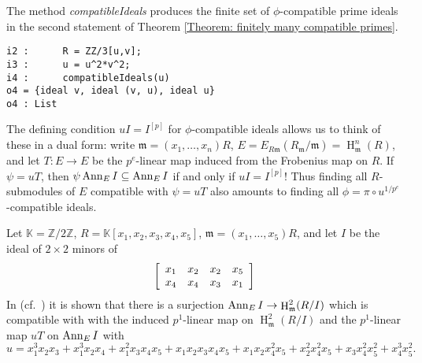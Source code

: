 \documentclass[11pt]{amsart}
\DeclareMathOperator{\HH}{H}
\begin{document}
The method \emph{compatibleIdeals} produces the finite set of $\phi$-compatible prime ideals in the second statement of Theorem \ref{Theorem: finitely many compatible primes}.

\begin{verbatim}
i2 :      R = ZZ/3[u,v];
i3 :      u = u^2*v^2;
i4 :      compatibleIdeals(u)
o4 = {ideal v, ideal (v, u), ideal u}
o4 : List
\end{verbatim}

The defining condition $u I = I^{[p]}$ for $\phi$-compatible ideals allows us to
think of these in a dual form: write $\mathfrak{m}=(x_1, \dots, x_n)R$,
$E=E_{R\mathfrak{m}}(R_{\mathfrak{m}}/\mathfrak{m})=\HH^n_{\mathfrak{m}} (R)$, and let $T: E \rightarrow E$ be the $p^e$-linear map
induced from the Frobenius map on $R$.
If $\psi=u T$, then $\psi \operatorname{{Ann}}_E I \subseteq \operatorname{{Ann}}_E I$ if and only if $u I = I^{[p]}$!
Thus finding all $R$-submodules of $E$ compatible with $\psi=u T$ also amounts to finding all
$\phi=\pi \circ u^{1/p^e}$-compatible ideals.


Let $\mathbb{K}=\mathbb{Z}/2\mathbb{Z}$, $R=\mathbb{K}[x_1, x_2, x_3, x_4, x_5]$, $\mathfrak{m}=(x_1, \dots, x_5)R$, and let $I$ be the ideal of
$2\times 2$ minors of
$$
\left[
\begin{array}{c c c c}
 x_1 & x_2 & x_2 & x_5\\
 x_4 & x_4 & x_3 & x_1
\end{array}
\right]
$$
In (cf.~\cite[\S 9]{KatzmanParameterTestIdealOfCMRings}) it is shown that
there is a surjection $\Ann_E I \rightarrow \HH^2_{\mathfrak{m}} (R/I)$
which is compatible with with the induced $p^1$-linear map on $\HH^2_{\mathfrak{m}} (R/I)$
and the $p^1$-linear map $u T$ on $\operatorname{{Ann}}_E I$ with
$$u=x_1^3x_2x_3 + x_1^3x_2x_4+x_1^2x_3x_4x_5+ x_1x_2x_3x_4x_5+ x_1x_2x_4^2x_5+ x_2^2x_4^2x_5+x_3x_4^2x_5^2+ x_4^3x_5^2 .$$
\end{document}

